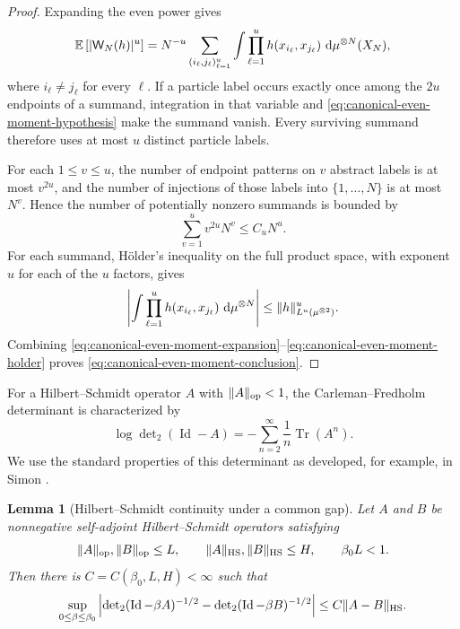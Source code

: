 \documentclass[11pt,reqno]{amsart}
\numberwithin{equation}{section}
\theoremstyle{plain}
\newtheorem{lemma}[lemma]{Lemma}
\theoremstyle{definition}
\DeclarePairedDelimiter{\abs}{\lvert}{\rvert}
\DeclarePairedDelimiter{\norm}{\lVert}{\rVert}
\newcommand{\dd}{\mathop{}\!\mathrm d}
\newcommand{\E}{\mathbb E}
\newcommand{\Id}{\operatorname{Id}}
\newcommand{\Tr}{\operatorname{Tr}}
\newcommand{\HS}{\mathrm{HS}}
\newcommand{\op}{\mathrm{op}}
\newcommand{\be}{\beta}
\newcommand{\XN}{X_N}
\begin{document}
\begin{proof}
Expanding the even power gives
\begin{equation}
 \E\left[\abs{\mathsf W_N(h)}^u\right]
 =N^{-u}\sum_{(i_\ell,j_\ell)_{\ell=1}^u}
 \int\prod_{\ell=1}^uh(x_{i_\ell},x_{j_\ell})
 \,\dd\mu^{\otimes N}(\XN),
 \label{eq:canonical-even-moment-expansion}
\end{equation}
where $i_\ell\neq j_\ell$ for every $\ell$.  If a particle label occurs exactly once among the $2u$ endpoints of a summand, integration in that variable and \eqref{eq:canonical-even-moment-hypothesis} make the summand vanish.  Every surviving summand therefore uses at most $u$ distinct particle labels.

For each $1\leq v\leq u$, the number of endpoint patterns on $v$ abstract labels is at most $v^{2u}$, and the number of injections of those labels into $\{1,\ldots,N\}$ is at most $N^v$.  Hence the number of potentially nonzero summands is bounded by
\begin{equation}
 \sum_{v=1}^uv^{2u}N^v\leq C_uN^u.
 \label{eq:canonical-even-moment-count}
\end{equation}
For each summand, H\"older's inequality on the full product space, with exponent $u$ for each of the $u$ factors, gives
\begin{equation}
 \left|\int\prod_{\ell=1}^uh(x_{i_\ell},x_{j_\ell})
 \,\dd\mu^{\otimes N}\right|
 \leq\norm{h}_{L^u(\mu^{\otimes2})}^u.
 \label{eq:canonical-even-moment-holder}
\end{equation}
Combining \eqref{eq:canonical-even-moment-expansion}--\eqref{eq:canonical-even-moment-holder} proves \eqref{eq:canonical-even-moment-conclusion}.
\end{proof}

For a Hilbert--Schmidt operator $A$ with $\norm A_{\op}<1$, the Carleman--Fredholm determinant is characterized by
\begin{equation}
 \log\det\nolimits_2(\Id-A)
 =-\sum_{n=2}^\infty\frac1n\Tr(A^n).
 \label{eq:det2-series-definition}
\end{equation}
We use the standard properties of this determinant as developed, for example, in Simon \cite[Chapter~9]{Simon2005}.

\begin{lemma}[Hilbert--Schmidt continuity under a common gap]
\label{lem:determinant-continuity}
Let $A$ and $B$ be nonnegative self-adjoint Hilbert--Schmidt operators satisfying
\begin{equation}
 \norm A_{\op},\norm B_{\op}\leq L,
 \qquad
 \norm A_{\HS},\norm B_{\HS}\leq H,
 \qquad
 \be_0L<1.
 \label{eq:determinant-continuity-hypotheses}
\end{equation}
Then there is $C=C(\be_0,L,H)<\infty$ such that
\begin{equation}
 \sup_{0\leq\be\leq\be_0}
 \left|\det\nolimits_2(\Id-\be A)^{-1/2}
 -\det\nolimits_2(\Id-\be B)^{-1/2}\right|
 \leq C\norm{A-B}_{\HS}.
 \label{eq:determinant-continuity-conclusion}
\end{equation}
\end{lemma}
\end{document}
